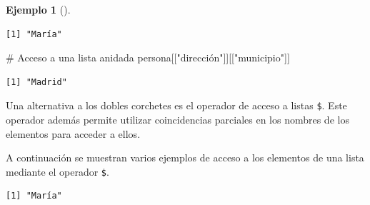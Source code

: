 \documentclass[
  a4paper,
]{scrreport}
\newenvironment{Shaded}{\begin{snugshade}}{\end{snugshade}}
\newcommand{\CommentTok}[1]{\textcolor[rgb]{0.37,0.37,0.37}{#1}}
\newcommand{\DecValTok}[1]{\textcolor[rgb]{0.68,0.00,0.00}{#1}}
\newcommand{\FunctionTok}[1]{\textcolor[rgb]{0.28,0.35,0.67}{#1}}
\newcommand{\NormalTok}[1]{\textcolor[rgb]{0.00,0.23,0.31}{#1}}
\newcommand{\OtherTok}[1]{\textcolor[rgb]{0.00,0.23,0.31}{#1}}
\newcommand{\SpecialCharTok}[1]{\textcolor[rgb]{0.37,0.37,0.37}{#1}}
\newcommand{\StringTok}[1]{\textcolor[rgb]{0.13,0.47,0.30}{#1}}
\theoremstyle{definition}
\newtheorem{example}{Ejemplo}[chapter]
\theoremstyle{definition}
\theoremstyle{remark}
\begin{document}
\begin{example}[]
\begin{verbatim}
[1] "María"
\end{verbatim}

\begin{Shaded}
\begin{Highlighting}[]
\CommentTok{\# Acceso a una lista anidada}
\NormalTok{persona[[}\StringTok{"dirección"}\NormalTok{]][[}\StringTok{"municipio"}\NormalTok{]]}
\end{Highlighting}
\end{Shaded}

\begin{verbatim}
[1] "Madrid"
\end{verbatim}

\end{example}

Una alternativa a los dobles corchetes es el operador de acceso a listas
\texttt{\$}. Este operador además permite utilizar coincidencias
parciales en los nombres de los elementos para acceder a ellos.

A continuación se muestran varios ejemplos de acceso a los elementos de
una lista mediante el operador \texttt{\$}.

\begin{Shaded}
\end{Shaded}

\begin{verbatim}
[1] "María"
\end{verbatim}

\begin{Shaded}
\end{Shaded}
\end{document}
